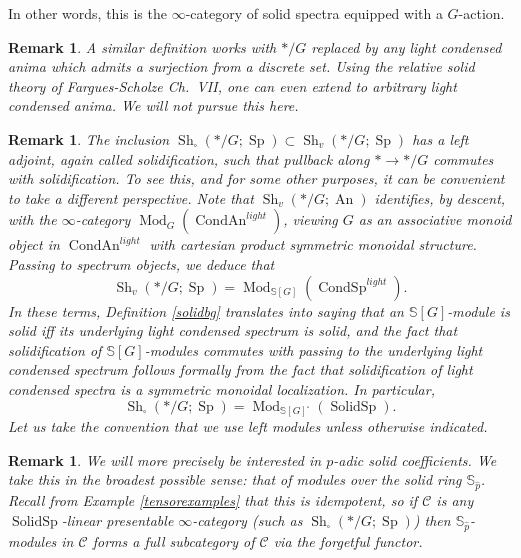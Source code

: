 \documentclass[12pt]{article}
\newtheorem{remark}[theorem]{Remark}
\newcommand{\on}{\operatorname}
\newcommand{\solid}{\square}
\begin{document}
In other words, this is the $\infty$-category of solid spectra equipped with a $G$-action.

\begin{remark}
A similar definition works with $\ast/G$ replaced by any light condensed anima which admits a surjection from a discrete set.  Using the relative solid theory of Fargues-Scholze \cite{FarguesGeometrization} Ch.\ VII, one can even extend to arbitrary light condensed anima.  We will not pursue this here.
\end{remark}

\begin{remark}\label{moduleperspective}
The inclusion $\on{Sh}_\square(\ast/G;\on{Sp})\subset \on{Sh}_{v}(\ast/G;\on{Sp})$ has a left adjoint, again called solidification, such that pullback along $\ast\to\ast/G$ commutes with solidification.  To see this, and for some other purposes, it can be convenient to take a different perspective.  Note that $\on{Sh}_v(\ast/G;\on{An})$ identifies, by descent, with the $\infty$-category $\on{Mod}_G(\on{CondAn}^{light})$, viewing $G$ as an associative monoid object in $\on{CondAn}^{light}$ with cartesian product symmetric monoidal structure.  Passing to spectrum objects, we deduce that
$$\on{Sh}_v(\ast/G;\on{Sp})=\on{Mod}_{\mathbb{S}[G]}(\on{CondSp}^{light}).$$
In these terms, Definition \ref{solidbg} translates into saying that an $\mathbb{S}[G]$-module is solid iff its underlying light condensed spectrum is solid, and the fact that solidification of $\mathbb{S}[G]$-modules commutes with passing to the underlying light condensed spectrum follows formally from the fact that solidification of light condensed spectra is a symmetric monoidal localization.  In particular,
$$\on{Sh}_\solid(\ast/G;\on{Sp}) = \on{Mod}_{\mathbb{S}[G]^\solid}(\on{SolidSp}).$$
Let us take the convention that we use \emph{left} modules unless otherwise indicated.
\end{remark}


\begin{remark}
We will more precisely be interested in $p$-adic solid coefficients.  We take this in the broadest possible sense: that of modules over the solid ring $\mathbb{S}_{\widehat{p}}$.  Recall from Example \ref{tensorexamples} that this is idempotent, so if $\mathcal{C}$ is any $\on{SolidSp}$-linear presentable $\infty$-category (such as $\on{Sh}_\solid(\ast/G;\on{Sp})$) then $\mathbb{S}_{\widehat{p}}$-modules in $\mathcal{C}$ forms a full subcategory of $\mathcal{C}$ via the forgetful functor.
\end{remark}
\end{document}
